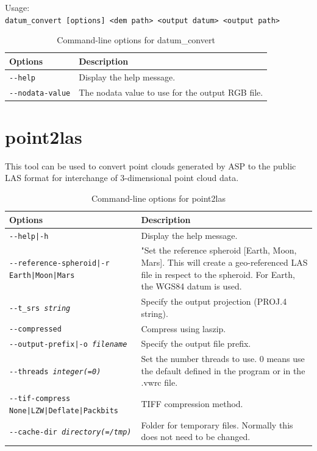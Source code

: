 Usage:\\
\hspace*{2em}\texttt{datum\_convert [options] <dem path> <output datum> <output path>}

\medskip

\begin{longtable}{|l|p{10cm}|}
\caption{Command-line options for datum\_convert}
\label{tbl:datumconvert}
\endfirsthead
\endhead
\endfoot
\endlastfoot
\hline
Options & Description \\ \hline \hline
\texttt{-\/-help} & Display the help message.\\ \hline
\texttt{-\/-nodata-value} & The nodata value to use for the output RGB file.\\ \hline
\end{longtable}




\section{point2las}
\label{point2las}

This tool can be used to convert point clouds generated by ASP to the
public LAS format for interchange of 3-dimensional point cloud data.

\begin{longtable}{|l|p{10cm}|}
\caption{Command-line options for point2las}
\label{tbl:point2las}
\endfirsthead
\endhead
\endfoot
\endlastfoot
\hline
Options & Description \\ \hline \hline
\texttt{-\/-help|-h} & Display the help message.\\ \hline
\texttt{-\/-reference-spheroid|-r Earth|Moon|Mars} & "Set the reference spheroid [Earth, Moon, Mars]. This will create a geo-referenced LAS file in respect to the spheroid. For Earth, the WGS84 datum is used. \\ \hline
\texttt{-\/-t\_srs \textit{string}} & Specify the output projection (PROJ.4 string). \\ \hline
\texttt{-\/-compressed} &
Compress using laszip. \\ \hline
\texttt{-\/-output-prefix|-o \textit{filename}} & Specify the output file prefix. \\ \hline
\texttt{-\/-threads \textit{integer(=0)}} & Set the number threads to use. 0 means use the default defined in the program or in the .vwrc file.\\ \hline
\texttt{-\/-tif-compress None|LZW|Deflate|Packbits} & TIFF compression method.\\ \hline
\texttt{-\/-cache-dir \textit{directory(=/tmp)}} & Folder for temporary files. Normally this does not need to be changed.\\ \hline
\end{longtable}

